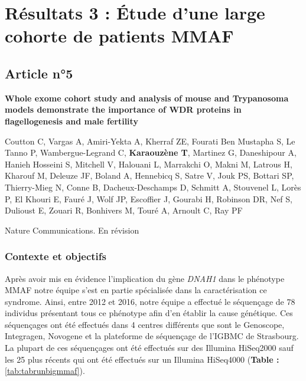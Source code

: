 \documentclass[12pt,a4paper,twoside]{ugathesis}
\begin{document}
\newpage  

\section{Résultats 3 : Étude d'une large cohorte de patients
MMAF}\label{resultats-3-etude-dune-large-cohorte-de-patients-mmaf}

\subsection{Article n°5}\label{article-n5}

\textbf{Whole exome cohort study and analysis of mouse and Trypanosoma
models demonstrate the importance of WDR proteins in flagellogenesis and
male fertility}

Coutton C, Vargas A, Amiri-Yekta A, Kherraf ZE, Fourati Ben Mustapha S,
Le Tanno P, Wambergue-Legrand C, \textbf{Karaouzène T}, Martinez G,
Daneshipour A, Hanieh Hosseini S, Mitchell V, Halouani L, Marrakchi O,
Makni M, Latrous H, Kharouf M, Deleuze JF, Boland A, Hennebicq S, Satre
V, Jouk PS, Bottari SP, Thierry-Mieg N, Conne B, Dacheux-Deschamps D,
Schmitt A, Stouvenel L, Lorès P, El Khouri E, Fauré J, Wolf JP,
Escoffier J, Gourabi H, Robinson DR, Nef S, Dulioust E, Zouari R,
Bonhivers M, Touré A, Arnoult C, Ray PF

Nature Communications. En révision

\newpage

\subsubsection{Contexte et objectifs}\label{contexte-et-objectifs-4}

Après avoir mis en évidence l'implication du gène \emph{DNAH1} dans le
phénotype MMAF notre équipe s'est en partie spécialisée dans la
caractérisation ce syndrome. Ainsi, entre 2012 et 2016, notre équipe a
effectué le séquençage de 78 individus présentant tous ce phénotype afin
d'en établir la cause génétique. Ces séquençages ont été effectués dans
4 centres différents que sont le Genoscope, Integragen, Novogene et la
plateforme de séquençage de l'IGBMC de Strasbourg. La plupart de ces
séquençages ont été effectués sur des Illumina HiSeq2000 sauf les 25
plus récents qui ont été effectués sur un Illumina HiSeq4000
(\textbf{Table : }\ref{tab:tabrunbigmmaf}).
\end{document}
